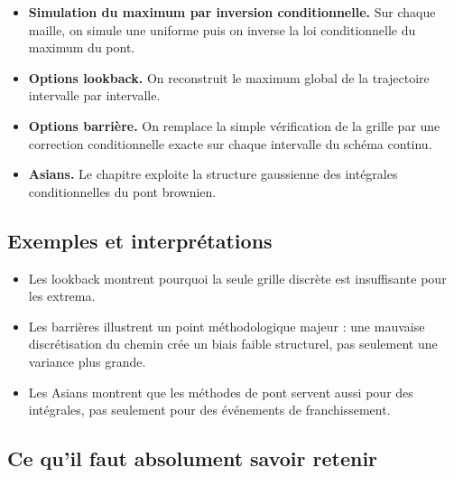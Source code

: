 \documentclass[11pt,a4paper]{article}
\begin{document}
\begin{itemize}
  \item \textbf{Simulation du maximum par inversion conditionnelle.} Sur chaque maille, on simule une uniforme puis on inverse la loi conditionnelle du maximum du pont.
  \item \textbf{Options lookback.} On reconstruit le maximum global de la trajectoire intervalle par intervalle.
  \item \textbf{Options barrière.} On remplace la simple vérification de la grille par une correction conditionnelle exacte sur chaque intervalle du schéma continu.
  \item \textbf{Asians.} Le chapitre exploite la structure gaussienne des intégrales conditionnelles du pont brownien.
\end{itemize}

\subsection{Exemples et interprétations}

\begin{itemize}
  \item Les lookback montrent pourquoi la seule grille discrète est insuffisante pour les extrema.
  \item Les barrières illustrent un point méthodologique majeur : une mauvaise discrétisation du chemin crée un biais faible structurel, pas seulement une variance plus grande.
  \item Les Asians montrent que les méthodes de pont servent aussi pour des intégrales, pas seulement pour des événements de franchissement.
\end{itemize}

\subsection{Ce qu'il faut absolument savoir retenir}
\end{document}
